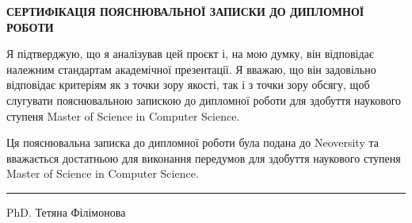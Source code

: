 
\begin{center}
{\fontsize{14pt}{16.8pt}\selectfont\bfseries
СЕРТИФІКАЦІЯ ПОЯСНЮВАЛЬНОЇ ЗАПИСКИ ДО ДИПЛОМНОЇ РОБОТИ
}
\end{center}

\vspace{2cm}

Я підтверджую, що я аналізував цей проєкт і, на мою думку, він відповідає належним стандартам академічної презентації. Я вважаю, що він задовільно відповідає критеріям як з точки зору якості, так і з точки зору обсягу, щоб слугувати пояснювальною запискою до дипломної роботи для здобуття наукового ступеня Master of Science in Computer Science.

\vspace{1cm}

Ця пояснювальна записка до дипломної роботи була подана до Neoversity та вважається достатньою для виконання передумов для здобуття наукового ступеня Master of Science in Computer Science.

\vspace{4cm}

\noindent
\rule{0.4\textwidth}{0.4pt}

\noindent
PhD. Тетяна Філімонова

